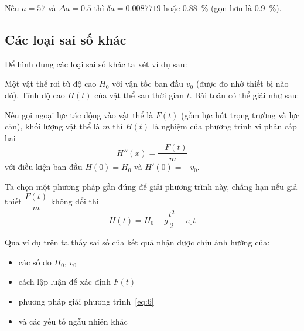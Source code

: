 \documentclass[../../Lectures.tex]{subfiles}
\begin{document}
\begin{exmp}
    Nếu \(a = \num{57}\) và \(\Delta a = \num{0.5}\) thì \(\delta a =
    \num{0.0087719}\) hoặc \SI{0.88}{\percent} (gọn hơn là \SI{0.9}{\percent}).
\end{exmp}

\subsection{Các loại sai số khác}

Để hình dung các loại sai số khác ta xét ví dụ sau:

\begin{exmp}
    Một vật thể rơi từ độ cao \(H_0\) với vận tốc ban đầu \(v_0\) (được đo nhờ
    thiết bị nào đó). Tính độ cao \(H(t)\) của vật thể sau thời gian \(t\). Bài
    toán có thể giải như sau:

    Nếu gọi ngoại lực tác động vào vật thể là \(F(t)\) (gồm lực hút trọng trường
    và lực cản), khối lượng vật thể là \(m\) thì \(H(t)\) là nghiệm của phương
    trình vi phân cấp hai
    \begin{equation} \label{eq:6}
        H''(x) = \frac{-F(t)}{m}
    \end{equation}
    với điều kiện ban đầu \(H(0) = H_0\) và \(H'(0) = -v_0\).

    Ta chọn một phương pháp gần đúng để giải phương trình này, chẳng hạn nếu giả
    thiết \(\dfrac{F(t)}{m}\) không đổi thì
    \[H(t) = H_0 - g\frac{t^2}{2} -v_0 t\]
\end{exmp}

Qua ví dụ trên ta thấy sai số của kết quả nhận được chịu ảnh hưởng của:
\begin{itemize}
    \item các số đo \(H_0\), \(v_0\)
    \item cách lập luận để xác định \(F(t)\)
    \item phương pháp giải phương trình~\ref{eq:6}
    \item và các yếu tố ngẫu nhiên khác
\end{itemize}
\end{document}
